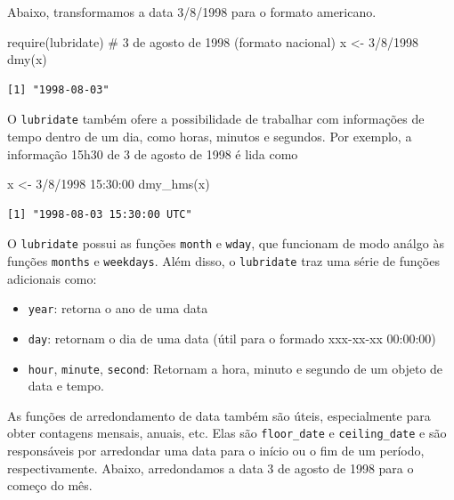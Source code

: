\documentclass[
  letterpaper,
  DIV=11,
  numbers=noendperiod]{scrartcl}
\newenvironment{Shaded}{\begin{snugshade}}{\end{snugshade}}
\newcommand{\CommentTok}[1]{\textcolor[rgb]{0.37,0.37,0.37}{#1}}
\newcommand{\FunctionTok}[1]{\textcolor[rgb]{0.28,0.35,0.67}{#1}}
\newcommand{\NormalTok}[1]{\textcolor[rgb]{0.00,0.23,0.31}{#1}}
\newcommand{\OtherTok}[1]{\textcolor[rgb]{0.00,0.23,0.31}{#1}}
\newcommand{\StringTok}[1]{\textcolor[rgb]{0.13,0.47,0.30}{#1}}
\providecommand{\tightlist}{%
  \setlength{\itemsep}{0pt}\setlength{\parskip}{0pt}}
\theoremstyle{definition}
\theoremstyle{definition}
\theoremstyle{plain}
\theoremstyle{plain}
\theoremstyle{remark}
\begin{document}
Abaixo, transformamos a data 3/8/1998 para o formato americano.

\begin{Shaded}
\begin{Highlighting}[]
\FunctionTok{require}\NormalTok{(lubridate)}
\CommentTok{\# 3 de agosto de 1998 (formato nacional)}
\NormalTok{x }\OtherTok{\textless{}{-}} \StringTok{\textquotesingle{}3/8/1998\textquotesingle{}}
\FunctionTok{dmy}\NormalTok{(x)}
\end{Highlighting}
\end{Shaded}

\begin{verbatim}
[1] "1998-08-03"
\end{verbatim}

O \texttt{lubridate} também ofere a possibilidade de trabalhar com
informações de tempo dentro de um dia, como horas, minutos e segundos.
Por exemplo, a informação 15h30 de 3 de agosto de 1998 é lida como

\begin{Shaded}
\begin{Highlighting}[]
\NormalTok{x }\OtherTok{\textless{}{-}} \StringTok{\textquotesingle{}3/8/1998 15:30:00\textquotesingle{}}
\FunctionTok{dmy\_hms}\NormalTok{(x)}
\end{Highlighting}
\end{Shaded}

\begin{verbatim}
[1] "1998-08-03 15:30:00 UTC"
\end{verbatim}

O \texttt{lubridate} possui as funções \texttt{month} e \texttt{wday},
que funcionam de modo análgo às funções \texttt{months} e
\texttt{weekdays}. Além disso, o \texttt{lubridate} traz uma série de
funções adicionais como:

\begin{itemize}
\tightlist
\item
  \texttt{year}: retorna o ano de uma data
\item
  \texttt{day}: retornam o dia de uma data (útil para o formado
  xxx-xx-xx 00:00:00)
\item
  \texttt{hour}, \texttt{minute}, \texttt{second}: Retornam a hora,
  minuto e segundo de um objeto de data e tempo.
\end{itemize}

As funções de arredondamento de data também são úteis, especialmente
para obter contagens mensais, anuais, etc. Elas são \texttt{floor\_date}
e \texttt{ceiling\_date} e são responsáveis por arredondar uma data para
o início ou o fim de um período, respectivamente. Abaixo, arredondamos a
data 3 de agosto de 1998 para o começo do mês.
\end{document}
